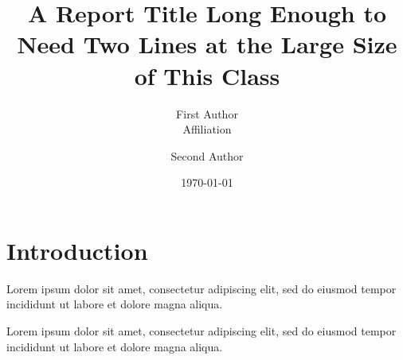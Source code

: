\documentclass[twoside,11pt]{report}
\title{A Report Title Long Enough to Need Two Lines at the Large Size of This Class}
\author{First Author \\ Affiliation \and Second Author}
\date{\today}
\begin{document}
\maketitle
\chapter{Introduction}
Lorem ipsum dolor sit amet, consectetur adipiscing elit, sed do eiusmod tempor incididunt ut labore et dolore magna aliqua.

Lorem ipsum dolor sit amet, consectetur adipiscing elit, sed do eiusmod tempor incididunt ut labore et dolore magna aliqua.
\end{document}
